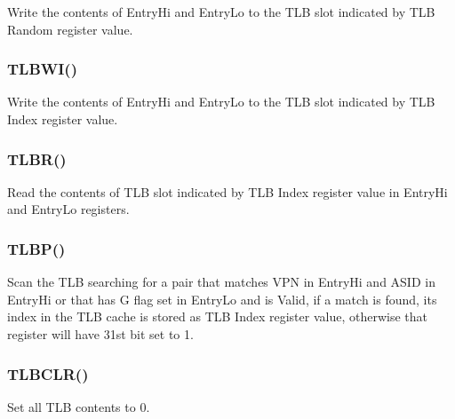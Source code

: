 Write the contents of EntryHi and EntryLo to the TLB slot indicated by TLB Random register value.

\subsubsection{TLBWI()}

Write the contents of EntryHi and EntryLo to the TLB slot indicated by TLB Index register value.

\subsubsection{TLBR()}

Read the contents of TLB slot indicated by TLB Index register value in EntryHi and EntryLo registers.

\subsubsection{TLBP()}

Scan the TLB searching for a pair that matches VPN in EntryHi and ASID in EntryHi or that has G flag set in EntryLo and is Valid, if a match is found, its index in the TLB cache is stored as TLB Index register value, otherwise that register will have 31st bit set to 1.

\subsubsection{TLBCLR()}

Set all TLB contents to 0.
